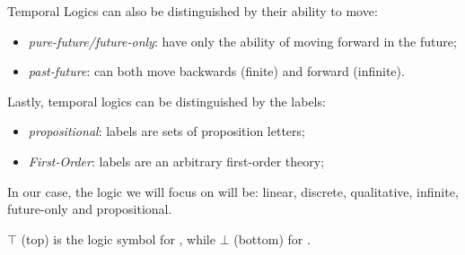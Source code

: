 \documentclass[oneside]{academica}
\begin{document}
Temporal Logics can also be distinguished by their ability to move:
\begin{itemize}
  \item \emph{pure-future/future-only}: have only the ability of moving forward in the future;
  \item \emph{past-future}: can both move backwards (finite) and forward (infinite).
\end{itemize}

Lastly, temporal logics can be distinguished by the labels:
\begin{itemize}
  \item \emph{propositional}: labels are sets of proposition letters;
  \item \emph{First-Order}: labels are an arbitrary first-order theory;
\end{itemize}

In our case, the logic we will focus on will be: linear, discrete, qualitative, infinite, future-only and propositional.

\begin{note}
  $\top$ (top) is the logic symbol for \true, while $\bot$ (bottom) for \false.
\end{note}
\end{document}
